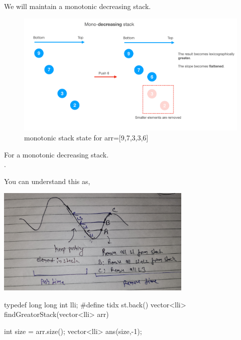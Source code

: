 \begin{solution}[Stack | $O(n)$]
    We will maintain a monotonic decreasing stack.
   
    \begin{figure}[ht]
        \includegraphics[width=\textwidth]{./resources/mono-decreasing-stack.png}
        \caption{monotonic stack state for arr=[9,7,3,3,6]}

    \end{figure}
        
    For a monotonic decreasing stack.\\
    \faHandPointRight\hspace{2mm}{we push array element to stack if current element is smaller than stack tidx}.\\
    \faHandPointRight\hspace{2mm}{we pop a element from stack if current element is greator than stack tidx.}
   
    You can understand this as, 

    \includegraphics[width=0.7\textwidth]{./resources/monotonic-decreasing-stack.jpg}

    \begin{fullwidth}
    \begin{code3}
        typedef long long int lli;
        #define tidx st.back()
        vector<lli> findGreatorStack(vector<lli> arr)
        {
            int size = arr.size();
            vector<lli> ans(size,-1);
            
}
\end{code3}
\end{fullwidth}
\end{solution}

